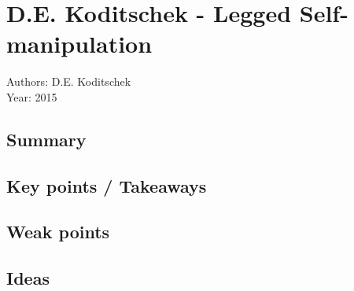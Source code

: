 \section{D.E. Koditschek - Legged Self-manipulation}
Authors: D.E. Koditschek\\
Year: 2015
\subsection*{Summary}
\subsection*{Key points / Takeaways}
\subsection*{Weak points}
\subsection*{Ideas}
